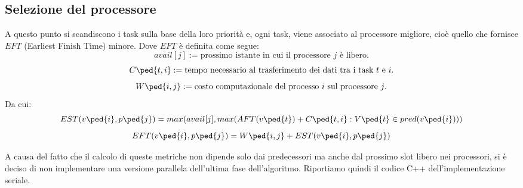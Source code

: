 \subsection{Selezione del processore}
A questo punto si scandiscono i task sulla base della loro priorità e, ogni task, viene associato al processore migliore, cioè quello che fornisce $EFT$ (Earliest Finish Time) minore. 
Dove $EFT$ è definita come segue:
\begin{displaymath}
	avail[j] := \text{prossimo istante in cui il processore $j$ è libero.}
\end{displaymath}
\begin{displaymath}
	C\ped{t,i} := \text{tempo necessario al trasferimento dei dati tra i task $t$ e $i$.} 
\end{displaymath}
\begin{displaymath}
	W\ped{i,j} := \text{costo computazionale del processo $i$ sul processore $j$.} 
\end{displaymath}
Da cui:
\begin{equation}\label{EST}
	EST(v\ped{i},p\ped{j}) = max(avail[j], max(AFT(v\ped{t}) + C\ped{t,i} : V\ped{t} \in pred(v\ped{i})))
\end{equation}
\begin{equation}\label{EFT}
	EFT(v\ped{i},p\ped{j}) = W\ped{i,j} + EST(v\ped{i},p\ped{j})
\end{equation}

A causa del fatto che il calcolo di queste metriche non dipende solo dai predecessori ma anche dal prossimo slot libero nei processori, si è deciso di non implementare una versione parallela dell'ultima fase dell'algoritmo. Riportiamo quindi il codice C++ dell'implementazione seriale.\\


